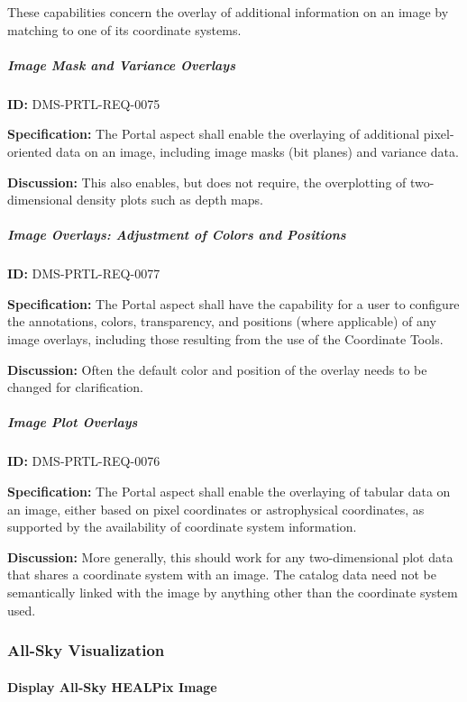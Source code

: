 \documentclass[SE,toc,lsstdraft]{lsstdoc}
\begin{document}
These capabilities concern the overlay of additional information on an image by matching to one of its coordinate systems.

\subparagraph{Image Mask and Variance Overlays}\hfill  %

\label{DMS-PRTL-REQ-0075}
\textbf{ID:} DMS-PRTL-REQ-0075

\textbf{Specification:}
The Portal aspect shall enable the overlaying of additional pixel-oriented data on an image, including image masks (bit planes) and variance data.

\textbf{Discussion:}
This also enables, but does not require, the overplotting of two-dimensional density plots such as depth maps.

\subparagraph{Image Overlays: Adjustment of Colors and Positions}\hfill  %

\label{DMS-PRTL-REQ-0077}
\textbf{ID:} DMS-PRTL-REQ-0077

\textbf{Specification:}
The Portal aspect shall have the capability for a user to configure the annotations, colors, transparency, and positions (where applicable) of any image overlays, including those resulting from the use of the Coordinate Tools.

\textbf{Discussion:}
Often the default color and position of the overlay needs to be changed for clarification.

\subparagraph{Image Plot Overlays}\hfill  %

\label{DMS-PRTL-REQ-0076}
\textbf{ID:} DMS-PRTL-REQ-0076

\textbf{Specification:}
The Portal aspect shall enable the overlaying of tabular data on an image, either based on pixel coordinates or astrophysical coordinates, as supported by the availability of coordinate system information.

\textbf{Discussion:}
More generally, this should work for any two-dimensional plot data that shares a coordinate system with an image.  The catalog data need not be semantically linked with the image by anything other than the coordinate system used.

\subsubsection{All-Sky Visualization}

\paragraph{Display All-Sky HEALPix Image}\hfill  %
\end{document}
